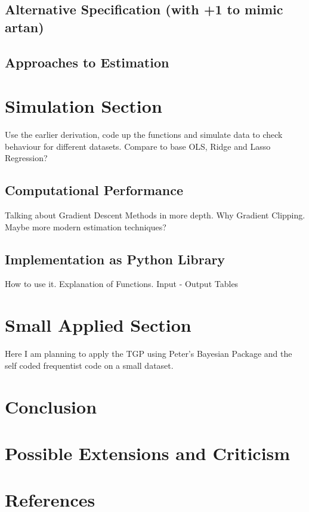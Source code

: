 \documentclass[12pt,a4paper]{article}
\begin{document}
\subsection{Alternative Specification (with +1 to mimic artan)}

\subsection{Approaches to Estimation}

\section{Simulation Section}
Use the earlier derivation, code up the functions and simulate data to check behaviour for different datasets. Compare to base OLS, Ridge and Lasso Regression?
\subsection{Computational Performance}
Talking about Gradient Descent Methods in more depth. Why Gradient Clipping. Maybe more modern estimation techniques? 
\subsection{Implementation as Python Library}

How to use it. 
Explanation of Functions. Input - Output Tables

\section{Small Applied Section}
Here I am planning to apply the TGP using Peter's Bayesian Package and the self coded frequentist code on a small dataset.
\section{Conclusion}
\section{Possible Extensions and Criticism}
\section{References}

\pagebreak
{}
\setcounter{page}{\thesavepage}
\pagestyle{plain}
%
%
\printbibliography[]
\clearpage
\appendix
\end{document}
